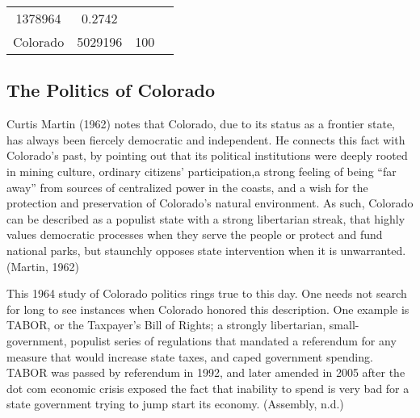 \documentclass[12pt,twoside]{reedthesis}
\begin{document}
\begin{longtable}[]{@{}cccc@{}}
\begin{minipage}[t]{0.21\columnwidth}
  1378964\strut
  \end{minipage} & \begin{minipage}[t]{0.20\columnwidth}\centering\strut
  0.2742\strut
  \end{minipage} & \begin{minipage}[t]{0.34\columnwidth}\centering\strut
  \strut
  \end{minipage}\tabularnewline
  \begin{minipage}[t]{0.13\columnwidth}\centering\strut
  Colorado\strut
  \end{minipage} & \begin{minipage}[t]{0.21\columnwidth}\centering\strut
  5029196\strut
  \end{minipage} & \begin{minipage}[t]{0.20\columnwidth}\centering\strut
  100\strut
  \end{minipage} & \begin{minipage}[t]{0.34\columnwidth}\centering\strut
  \strut
  \end{minipage}\tabularnewline
  \bottomrule
  \end{longtable}
  
  \clearpage
  
  \subsection{The Politics of Colorado}\label{the-politics-of-colorado}
  
  Curtis Martin (1962) notes that Colorado, due to its status as a
  frontier state, has always been fiercely democratic and independent. He
  connects this fact with Colorado's past, by pointing out that its
  political institutions were deeply rooted in mining culture, ordinary
  citizens' participation,a strong feeling of being ``far away'' from
  sources of centralized power in the coasts, and a wish for the
  protection and preservation of Colorado's natural environment. As such,
  Colorado can be described as a populist state with a strong libertarian
  streak, that highly values democratic processes when they serve the
  people or protect and fund national parks, but staunchly opposes state
  intervention when it is unwarranted. (Martin, 1962)
  
  This 1964 study of Colorado politics rings true to this day. One needs
  not search for long to see instances when Colorado honored this
  description. One example is TABOR, or the Taxpayer's Bill of Rights; a
  strongly libertarian, small-government, populist series of regulations
  that mandated a referendum for any measure that would increase state
  taxes, and caped government spending. TABOR was passed by referendum in
  1992, and later amended in 2005 after the dot com economic crisis
  exposed the fact that inability to spend is very bad for a state
  government trying to jump start its economy. (Assembly, n.d.)
  
\end{document}
